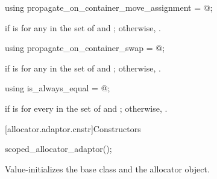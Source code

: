 \begin{indexed}{}
\begin{itemdecl}
using propagate_on_container_move_assignment = @\seebelow@;
\end{itemdecl}
\end{indexed}

\begin{itemdescr}
\pnum
\ctype {} if
 is
 for any  in the set of  and
; otherwise, .
\end{itemdescr}

\begin{indexed}{}
\begin{itemdecl}
using propagate_on_container_swap = @\seebelow@;
\end{itemdecl}
\end{indexed}

\begin{itemdescr}
\pnum
\ctype {} if
 is
 for any  in the set of  and
; otherwise, .
\end{itemdescr}

%
\begin{itemdecl}
using is_always_equal = @\seebelow@;
\end{itemdecl}

\begin{itemdescr}
\pnum
\ctype {} if
 is
 for every  in the set of  and
; otherwise, .
\end{itemdescr}

[allocator.adaptor.cnstr]{Constructors}

%
\begin{itemdecl}
scoped_allocator_adaptor();
\end{itemdecl}

\begin{itemdescr}
\pnum
\effects
Value-initializes the  base class and the  allocator
object.
\end{itemdescr}

